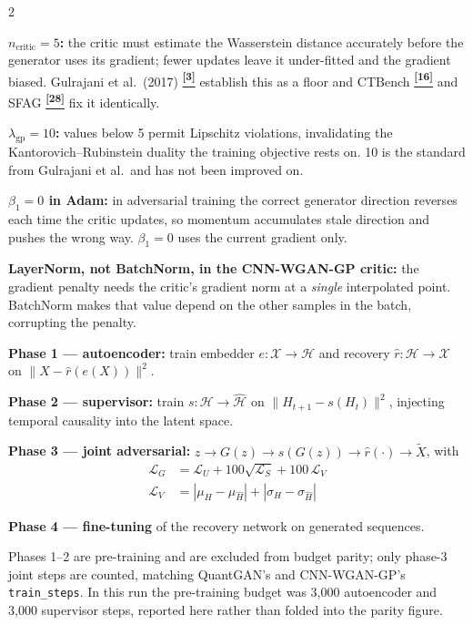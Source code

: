 \documentclass[10pt]{article}
\newcommand{\navybox}[2]{\begin{tcolorbox}[mybox={Navy}{LBg},title={#1}]#2\end{tcolorbox}}
\newcommand{\tealbox}[2]{\begin{tcolorbox}[mybox={Teal}{LBg},title={#1}]#2\end{tcolorbox}}
\newcommand{\tcite}[1]{%
  \hyperlink{R:#1}{\textsuperscript{\scriptsize\textbf{[#1]}}}}
\begin{document}
\vspace{6pt}
\begin{multicols}{2}
\small

\navybox{WGAN-GP shared settings (QuantGAN \& CNN-WGAN-GP)}{%
\textbf{$n_\text{critic}=5$:} the critic must estimate the Wasserstein distance accurately before the generator uses its gradient; fewer updates leave it under-fitted and the gradient biased. Gulrajani et al.\ (2017)\tcite{3} establish this as a floor and CTBench\tcite{16} and SFAG\tcite{28} fix it identically.

\textbf{$\lambda_\text{gp}=10$:} values below 5 permit Lipschitz violations, invalidating the Kantorovich--Rubinstein duality the training objective rests on. 10 is the standard from Gulrajani et al.\ and has not been improved on.

\textbf{$\beta_1=0$ in Adam:} in adversarial training the correct generator direction reverses each time the critic updates, so momentum accumulates stale direction and pushes the wrong way. $\beta_1=0$ uses the current gradient only.

\textbf{LayerNorm, not BatchNorm, in the CNN-WGAN-GP critic:} the gradient penalty needs the critic's gradient norm at a \emph{single} interpolated point. BatchNorm makes that value depend on the other samples in the batch, corrupting the penalty.}

\columnbreak

\tealbox{TimeGAN four-phase training}{%
\textbf{Phase 1 --- autoencoder:} train embedder $e:\mathcal{X}\to\mathcal{H}$ and recovery $\hat r:\mathcal{H}\to\mathcal{X}$ on $\|X-\hat r(e(X))\|^2$.

\textbf{Phase 2 --- supervisor:} train $s:\mathcal{H}\to\hat{\mathcal{H}}$ on $\|H_{t+1}-s(H_t)\|^2$, injecting temporal causality into the latent space.

\textbf{Phase 3 --- joint adversarial:} $z\to G(z)\to s(G(z))\to\hat r(\cdot)\to\tilde X$, with
\begin{align*}
\mathcal{L}_G &= \mathcal{L}_U + 100\sqrt{\mathcal{L}_S} + 100\,\mathcal{L}_V \\
\mathcal{L}_V &= |\mu_H-\mu_{\hat H}| + |\sigma_H-\sigma_{\hat H}|
\end{align*}

\textbf{Phase 4 --- fine-tuning} of the recovery network on generated sequences.

Phases 1--2 are pre-training and are excluded from budget parity; only phase-3 joint steps are counted, matching QuantGAN's and CNN-WGAN-GP's \texttt{train\_steps}. In this run the pre-training budget was 3,000 autoencoder and 3,000 supervisor steps, reported here rather than folded into the parity figure.}

\end{multicols}
\end{document}

